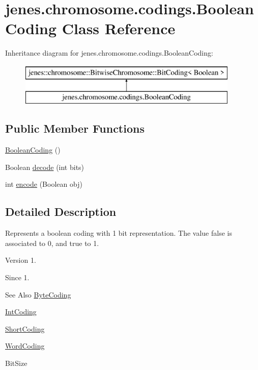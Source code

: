 \hypertarget{classjenes_1_1chromosome_1_1codings_1_1_boolean_coding}{\section{jenes.\-chromosome.\-codings.\-Boolean\-Coding Class Reference}
\label{classjenes_1_1chromosome_1_1codings_1_1_boolean_coding}
}
Inheritance diagram for jenes.\-chromosome.\-codings.\-Boolean\-Coding\-:\begin{figure}[H]
\begin{center}
\leavevmode
\includegraphics[height=2.000000cm]{classjenes_1_1chromosome_1_1codings_1_1_boolean_coding}
\end{center}
\end{figure}
\subsection*{Public Member Functions}
\begin{DoxyCompactItemize}
\item 
\hyperlink{classjenes_1_1chromosome_1_1codings_1_1_boolean_coding_a3a8318406c4a080fa5b39899de1831df}{Boolean\-Coding} ()
\item 
Boolean \hyperlink{classjenes_1_1chromosome_1_1codings_1_1_boolean_coding_a38188e39066ecd06e4c839bced2038d3}{decode} (int bits)
\item 
int \hyperlink{classjenes_1_1chromosome_1_1codings_1_1_boolean_coding_ace4181a4ef8bf37d9ad762d15422527b}{encode} (Boolean obj)
\end{DoxyCompactItemize}


\subsection{Detailed Description}
Represents a boolean coding with 1 bit representation. The value false is associated to 0, and true to 1.

\begin{DoxyVersion}{Version}
1. 
\end{DoxyVersion}
\begin{DoxySince}{Since}
1.
\end{DoxySince}
\begin{DoxySeeAlso}{See Also}
\hyperlink{classjenes_1_1chromosome_1_1codings_1_1_byte_coding}{Byte\-Coding} 

\hyperlink{classjenes_1_1chromosome_1_1codings_1_1_int_coding}{Int\-Coding} 

\hyperlink{classjenes_1_1chromosome_1_1codings_1_1_short_coding}{Short\-Coding} 

\hyperlink{classjenes_1_1chromosome_1_1codings_1_1_word_coding}{Word\-Coding} 

Bit\-Size 
\end{DoxySeeAlso}


